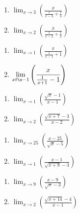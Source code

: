 \begin{multicols}{2}
\begin{enumerate}	\setcounter{enumi}{\value{Review}}
	\item $\displaystyle \lim_{x \to 3} \left(\frac{x}{\frac{1}{x-3}+\frac{1}{3}}\right)$
	\item $\displaystyle \lim_{x \to 2} \left(\frac{x}{\frac{1}{x-2}+\frac{1}{2}}\right)$
\end{enumerate}	\setcounter{Review}{\value{enumi}}
\end{multicols}
\begin{multicols}{2}
\begin{enumerate}	\setcounter{enumi}{\value{Review}}
	\item $\displaystyle \lim_{x \to 1} \left(\frac{x}{\frac{1}{x-1}+1}\right)$
	\item $\displaystyle \lim_{x t\o -1} \left(\frac{x}{\frac{1}{x+1}-1}\right)$
\end{enumerate}	\setcounter{Review}{\value{enumi}}
\end{multicols}
\begin{multicols}{2}
\begin{enumerate}	\setcounter{enumi}{\value{Review}}	
	\item $\displaystyle \lim_{x \to 1} \left(\frac{\sqrt{x}-1}{x-1}\right)$
	\item $\displaystyle \lim_{x \to 2} \left(\frac{\sqrt{x+7}-3}{x-2}\right)$
\end{enumerate}	\setcounter{Review}{\value{enumi}}
\end{multicols}
\begin{multicols}{2}
\begin{enumerate}	\setcounter{enumi}{\value{Review}}
	\item $\displaystyle \lim_{x \to 25} \left(\frac{x-25}{\sqrt{x}-5}\right)$
	\item $\displaystyle \lim_{x \to 1} \left(\frac{x-1}{\sqrt{x+8}-3}\right)$
\end{enumerate}	\setcounter{Review}{\value{enumi}}
\end{multicols}
\begin{multicols}{2}
\begin{enumerate}	\setcounter{enumi}{\value{Review}}
	\item $\displaystyle \lim_{x \to 9} \left(\frac{x-9}{\sqrt{x}-3}\right)$
	\item $\displaystyle \lim_{x \to 2} \left(\frac{\sqrt{x+14}-4}{x-1}\right)$
\end{enumerate}
\end{multicols}

